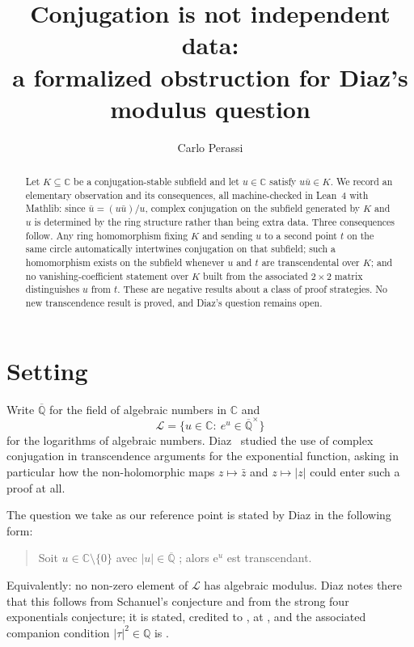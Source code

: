 \documentclass[11pt]{article}
\title{Conjugation is not independent data:\\
a formalized obstruction for Diaz's modulus question}
\author{Carlo Perassi}
\date{}
\theoremstyle{definition}
\theoremstyle{remark}
\newcommand{\C}{\mathbb{C}}
\newcommand{\Q}{\mathbb{Q}}
\newcommand{\Qbar}{\overline{\Q}}
\begin{document}
\maketitle

\begin{abstract}
Let $K\subseteq\C$ be a conjugation-stable subfield and let $u\in\C$ satisfy
$u\bar u\in K$. We record an elementary observation and its consequences,
all machine-checked in Lean~4 with Mathlib: since $\bar u=(u\bar u)/u$, complex
conjugation on the subfield generated by $K$ and $u$ is determined by the ring
structure rather than being extra data. Three consequences follow. Any ring
homomorphism fixing $K$ and sending $u$ to a second point $t$ on the same circle
automatically intertwines conjugation on that subfield; such a homomorphism
exists on the subfield whenever $u$ and $t$ are transcendental over $K$; and no
vanishing-coefficient statement over $K$ built from the associated $2\times2$
matrix distinguishes $u$ from $t$. These are negative results about a class of
proof strategies. No new transcendence result is proved, and Diaz's question
remains open.
\end{abstract}

\section{Setting}

Write $\Qbar$ for the field of algebraic numbers in $\C$ and
\[
  \mathcal{L}=\{u\in\C:\ e^{u}\in\Qbar^{\times}\}
\]
for the logarithms of algebraic numbers. Diaz~\cite{Diaz2004} studied the use of
complex conjugation in transcendence arguments for the exponential function,
asking in particular how the non-holomorphic maps $z\mapsto\bar z$ and
$z\mapsto|z|$ could enter such a proof at all.

The question we take as our reference point is stated by Diaz \cite[\S5.1,
p.~550]{Diaz2004} in the following form:

\begin{quote}
\og Soit $u\in\C\setminus\{0\}$ avec $|u|\in\Qbar$ ; alors $\mathrm{e}^{u}$ est
transcendant. \fg
\end{quote}

Equivalently: no non-zero element of $\mathcal{L}$ has algebraic modulus. Diaz
notes there that this follows from Schanuel's conjecture and from the strong
four exponentials conjecture; it is stated, credited to \cite{Diaz1997}, at
\cite[p.~399]{Waldschmidt2000}, and the associated companion condition
$|\tau|^{2}\in\Q$ is \cite[assertion (4-1), p.~237]{Diaz1997}.
\end{document}
